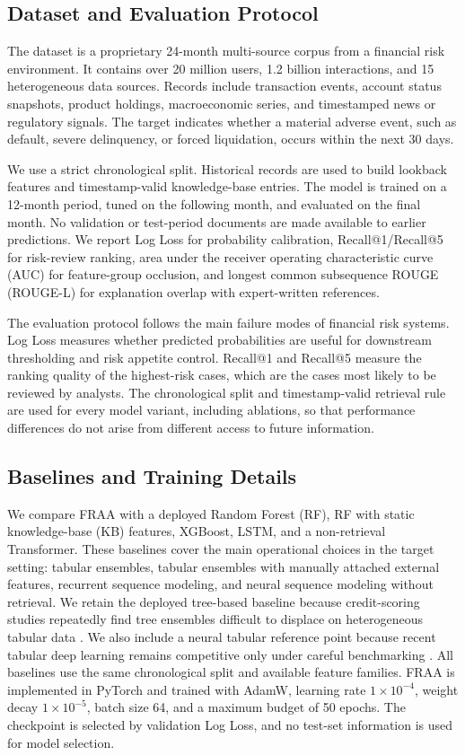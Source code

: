\documentclass[runningheads]{llncs}
\begin{document}
\subsection{Dataset and Evaluation Protocol}
The dataset is a proprietary 24-month multi-source corpus from a financial risk environment. It contains over 20 million users, 1.2 billion interactions, and 15 heterogeneous data sources. Records include transaction events, account status snapshots, product holdings, macroeconomic series, and timestamped news or regulatory signals. The target indicates whether a material adverse event, such as default, severe delinquency, or forced liquidation, occurs within the next 30 days.

We use a strict chronological split. Historical records are used to build lookback features and timestamp-valid knowledge-base entries. The model is trained on a 12-month period, tuned on the following month, and evaluated on the final month. No validation or test-period documents are made available to earlier predictions. We report Log Loss for probability calibration, Recall@1/Recall@5 for risk-review ranking, area under the receiver operating characteristic curve (AUC) for feature-group occlusion, and longest common subsequence ROUGE (ROUGE-L) for explanation overlap with expert-written references.

The evaluation protocol follows the main failure modes of financial risk systems. Log Loss measures whether predicted probabilities are useful for downstream thresholding and risk appetite control. Recall@1 and Recall@5 measure the ranking quality of the highest-risk cases, which are the cases most likely to be reviewed by analysts. The chronological split and timestamp-valid retrieval rule are used for every model variant, including ablations, so that performance differences do not arise from different access to future information.

\subsection{Baselines and Training Details}
We compare FRAA with a deployed Random Forest (RF), RF with static knowledge-base (KB) features, XGBoost, LSTM, and a non-retrieval Transformer. These baselines cover the main operational choices in the target setting: tabular ensembles, tabular ensembles with manually attached external features, recurrent sequence modeling, and neural sequence modeling without retrieval. We retain the deployed tree-based baseline because credit-scoring studies repeatedly find tree ensembles difficult to displace on heterogeneous tabular data \cite{baesens2003benchmarking,brown2012experimental}. We also include a neural tabular reference point because recent tabular deep learning remains competitive only under careful benchmarking \cite{arik2021tabnet}. All baselines use the same chronological split and available feature families. FRAA is implemented in PyTorch and trained with AdamW, learning rate $1\times10^{-4}$, weight decay $1\times10^{-5}$, batch size 64, and a maximum budget of 50 epochs. The checkpoint is selected by validation Log Loss, and no test-set information is used for model selection.
\end{document}
